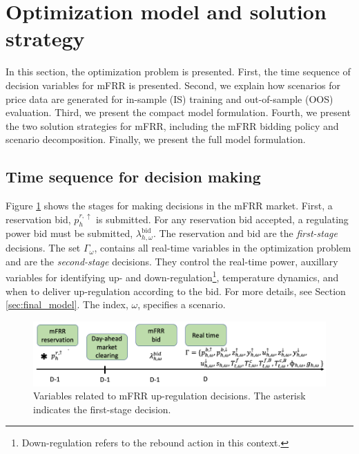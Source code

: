 \section{Optimization model and solution strategy}\label{sec:OptimizationModel}

In this section, the optimization problem is presented. First, the time sequence of decision variables for mFRR is presented. Second, we explain how scenarios for price data are generated for in-sample (IS) training and out-of-sample (OOS) evaluation. Third, we present the compact model formulation. Fourth, we present the two solution strategies for mFRR, including the mFRR bidding policy and scenario decomposition. Finally, we present the full model formulation.

\subsection{Time sequence for decision making}

Figure \ref{fig:timeline_mfrr_variables} shows the stages for making decisions in the mFRR market. First, a reservation bid, $p_{h}^{r,\uparrow}$ is submitted. For any reservation bid accepted, a regulating power bid must be submitted, $\lambda_{h,\omega}^{\text{bid}}$. The reservation and bid are the \textit{first-stage} decisions. The set $\Gamma_{\omega}$, contains all real-time variables in the optimization problem and are the \textit{second-stage} decisions. They control the real-time power, auxillary variables for identifying up- and down-regulation\footnote{Down-regulation refers to the rebound action in this context.}, temperature dynamics, and when to deliver up-regulation according to the bid. For more details, see Section \ref{sec:final_model}. The index, $\omega$, specifies a scenario.


\begin{figure}[!t]\label{fig:timeline_mfrr_variables}
    \centering
    \includegraphics[width=\columnwidth]{../figures/timeline_mfrr_variables.png}
    \caption{Variables related to mFRR up-regulation decisions. The asterisk indicates the first-stage decision.}
\end{figure}


